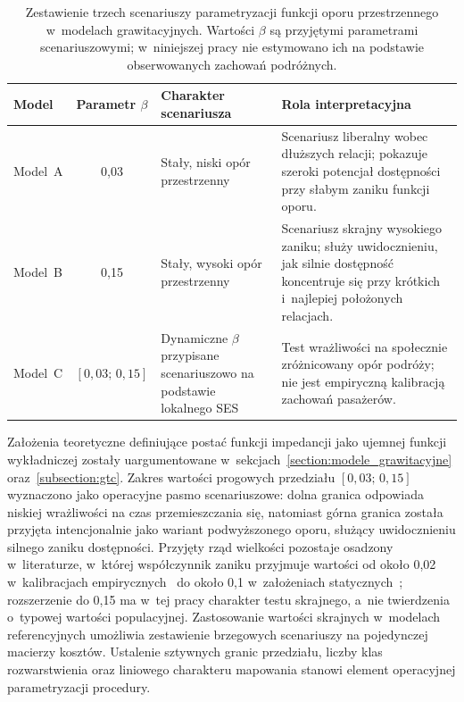 \documentclass{pracamgr}
\begin{document}
\begin{table}[H]
  \centering
  \small
  \renewcommand{\arraystretch}{1.3}
  \begin{tabular}{l|c|p{4.2cm}|p{5.2cm}}
    \hline
    \textbf{Model} & \textbf{Parametr $\beta$} & \textbf{Charakter scenariusza} & \textbf{Rola interpretacyjna} \\ \hline
    \mbox{Model~A} & 0{,}03 & Stały, niski opór przestrzenny & Scenariusz liberalny wobec dłuższych relacji; pokazuje szeroki potencjał dostępności przy słabym zaniku funkcji oporu. \\ \hline
    \mbox{Model~B} & 0{,}15 & Stały, wysoki opór przestrzenny & Scenariusz skrajny wysokiego zaniku; służy uwidocznieniu, jak silnie dostępność koncentruje się przy krótkich i~najlepiej położonych relacjach. \\ \hline
    \mbox{Model~C} & $[0{,}03;\,0{,}15]$ & Dynamiczne $\beta$ przypisane scenariuszowo na podstawie lokalnego \mbox{SES} & Test wrażliwości na społecznie zróżnicowany opór podróży; nie jest empiryczną kalibracją zachowań pasażerów. \\ \hline
  \end{tabular}
  \caption{Zestawienie trzech scenariuszy parametryzacji funkcji oporu przestrzennego w~modelach grawitacyjnych. Wartości $\beta$ są przyjętymi parametrami scenariuszowymi; w~niniejszej pracy nie estymowano ich na podstawie obserwowanych zachowań podróżnych.}
  \label{tab:gravity_model_scenarios}
\end{table}

Założenia teoretyczne definiujące postać funkcji impedancji jako ujemnej funkcji wykładniczej zostały uargumentowane w~sekcjach~\ref{section:modele_grawitacyjne} oraz~\ref{subsection:gtc}. Zakres wartości progowych przedziału $[0{,}03;\,0{,}15]$ wyznaczono jako operacyjne pasmo scenariuszowe: dolna granica odpowiada niskiej wrażliwości na czas przemieszczania się, natomiast górna granica została przyjęta intencjonalnie jako wariant podwyższonego oporu, służący uwidocznieniu silnego zaniku dostępności. Przyjęty rząd wielkości pozostaje osadzony w~literaturze, w~której współczynnik zaniku przyjmuje wartości od około 0{,}02 w~kalibracjach empirycznych~\cite{capetown} do około 0{,}1 w~założeniach statycznych~\cite{gravity2}; rozszerzenie do 0{,}15 ma w~tej pracy charakter testu skrajnego, a~nie twierdzenia o~typowej wartości populacyjnej. Zastosowanie wartości skrajnych w~modelach referencyjnych umożliwia zestawienie brzegowych scenariuszy na pojedynczej macierzy kosztów. Ustalenie sztywnych granic przedziału, liczby klas rozwarstwienia oraz liniowego charakteru mapowania stanowi element operacyjnej parametryzacji procedury.
\end{document}

